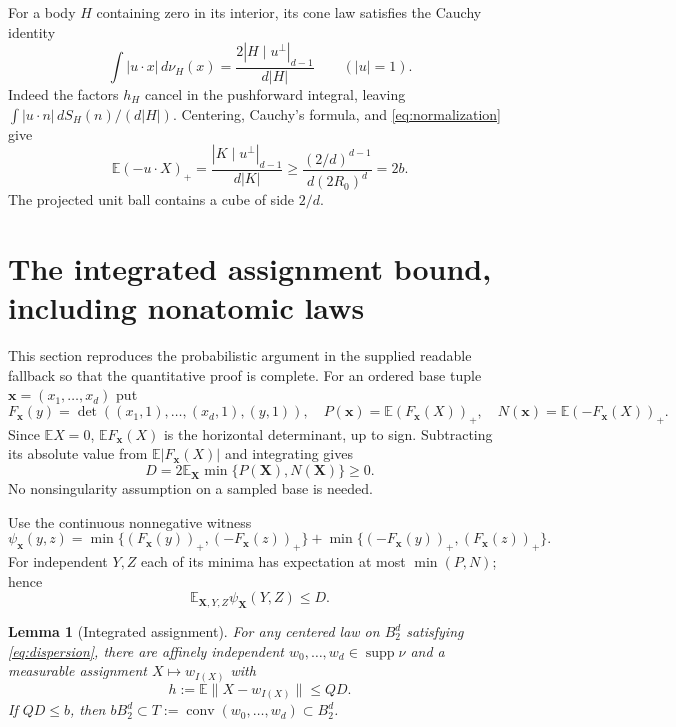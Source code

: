 \documentclass[11pt]{article}
\newtheorem{lemma}[theorem]{Lemma}
\newcommand{\conv}{\operatorname{conv}}
\newcommand{\supp}{\operatorname{supp}}
\newcommand{\EE}{\mathbb E}
\newcommand{\pos}[1]{(#1)_+}
\newcommand{\BB}{B_2^d}
\begin{document}
For a body $H$ containing zero in its interior, its cone law satisfies
the Cauchy identity
\begin{equation}\label{eq:brightness}
 \int |u\cdot x|\,d\nu_H(x)
   =\frac{2|H\mid u^\perp|_{d-1}}{d|H|}
       \qquad (|u|=1).
\end{equation}
Indeed the factors $h_H$ cancel in the pushforward integral, leaving
$\int|u\cdot n|\,dS_H(n)/(d|H|)$.
Centering, Cauchy's formula, and \eqref{eq:normalization} give
\begin{equation}\label{eq:dispersion}
 \EE\pos{-u\cdot X}
 =\frac{|K\mid u^\perp|_{d-1}}{d|K|}
 \ge\frac{(2/d)^{d-1}}{d(2R_0)^d}=2b.
\end{equation}
The projected unit ball contains a cube of side $2/d$.

\section{The integrated assignment bound, including nonatomic laws}

This section reproduces the probabilistic argument in the supplied readable
fallback so that the quantitative proof is complete.
For an ordered base tuple $\mathbf x=(x_1,\ldots,x_d)$ put
\[
 F_{\mathbf x}(y)
   =\det((x_1,1),\ldots,(x_d,1),(y,1)),
\quad
 P(\mathbf x)=\EE\pos{F_{\mathbf x}(X)},
\quad
 N(\mathbf x)=\EE\pos{-F_{\mathbf x}(X)}.
\]
Since $\EE X=0$, $\EE F_{\mathbf x}(X)$ is the horizontal determinant,
up to sign. Subtracting its absolute value from $\EE|F_{\mathbf x}(X)|$
and integrating gives
\begin{equation}\label{eq:cancellation}
 D=2\EE_{\mathbf X}\min\{P(\mathbf X),N(\mathbf X)\}\ge0.
\end{equation}
No nonsingularity assumption on a sampled base is needed.

Use the continuous nonnegative witness
\[
 \psi_{\mathbf x}(y,z)
 =\min\{\pos{F_{\mathbf x}(y)},\pos{-F_{\mathbf x}(z)}\}
  +\min\{\pos{-F_{\mathbf x}(y)},\pos{F_{\mathbf x}(z)}\}.
\]
For independent $Y,Z$ each of its minima has expectation at most
$\min(P,N)$; hence
\begin{equation}\label{eq:witness}
 \EE_{\mathbf X,Y,Z}\psi_{\mathbf X}(Y,Z)\le D.
\end{equation}

\begin{lemma}[Integrated assignment]\label{lem:assignment}
For any centered law on $\BB$ satisfying \eqref{eq:dispersion}, there are
affinely independent $w_0,\ldots,w_d\in\supp\nu$ and a measurable assignment
$X\mapsto w_{I(X)}$ with
\[
 h:=\EE\|X-w_{I(X)}\|\le QD.
\]
If $QD\le b$, then $b\BB\subset T:=\conv(w_0,\ldots,w_d)\subset\BB$.
\end{lemma}
\end{document}
